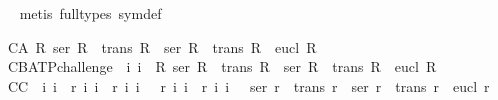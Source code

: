 \begin{isabellebody}
\isadelimproof
\ %
\endisadelimproof
%
\isatagproof
{}\isamarkupfalse%
\ {\isacharparenleft}metis\ {\isacharparenleft}full{\isacharunderscore}types{\isacharparenright}\ sym{\isacharunderscore}def{\isacharparenright}%
\endisatagproof
{\isafoldproof}%
%
\isadelimproof
%
\endisadelimproof
%
\begin{isamarkuptext}%
\begin{isbfig}{7em}
\end{isbfig}%
\end{isamarkuptext}%
\isamarkuptrue%
%
\isamarkuptrue%
\isamarkupfalse%
\ C{}{}{\isacharunderscore}A{\isacharcolon}\ {\isachardoublequoteopen}{\isasymforall}R{\isachardot}\ ser\ R\ {\isasymand}\ trans\ R\ {\isasymlongrightarrow}\ {\isacharparenleft}ser\ R\ {\isasymand}\ trans\ R\ {\isasymand}\ eucl\ R{\isacharparenright}{\isachardoublequoteclose}\isanewline
\ \isamarkupfalse%
%
\isadelimproof
\ %
\endisadelimproof
%
\isatagproof
{}\isamarkupfalse%
%
\endisatagproof
{\isafoldproof}%
%
\isadelimproof
%
\endisadelimproof
\isanewline
\isanewline
{}\isamarkupfalse%
\ C{}{}{\isacharunderscore}B{\isacharunderscore}ATP{\isacharunderscore}challenge{\isacharcolon}\ {\isachardoublequoteopen}{\isacharhash}\ i{}\ i{}\ {\isasymlongrightarrow}\ {\isasymnot}{\isacharparenleft}{\isasymforall}R{\isachardot}\ ser\ R\ {\isasymand}\ trans\ R\ {\isasymlongrightarrow}\ {\isacharparenleft}ser\ R\ {\isasymand}\ trans\ R\ {\isasymand}\ eucl\ R{\isacharparenright}{\isacharparenright}{\isachardoublequoteclose}\isanewline
%
\isadelimproof
\ %
\endisadelimproof
%
\isatagproof
{}\isamarkupfalse%
\ %
%
\endisatagproof
{\isafoldproof}%
%
\isadelimproof
\isanewline
%
\endisadelimproof
{}\isamarkupfalse%
\ C{}{}{\isacharunderscore}C{\isacharcolon}\ {\isachardoublequoteopen}{\isacharhash}\ i{}\ i{}\ {\isasymand}\ r\ i{}\ i{}\ {\isasymand}\ r\ i{}\ i{}\ {\isasymand}\ {\isasymnot}\ r\ i{}\ i{}\ {\isasymand}\ r\ i{}\ i{}\ {\isasymlongrightarrow}\ {\isasymnot}\ {\isacharparenleft}ser\ r\ {\isasymand}\ trans\ r\ {\isasymlongrightarrow}\ {\isacharparenleft}ser\ r\ {\isasymand}\ trans\ r\ {\isasymand}\ eucl\ r{\isacharparenright}{\isacharparenright}{\isachardoublequoteclose}\ \isanewline

\end{isabellebody}
